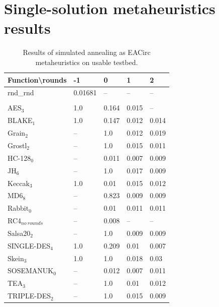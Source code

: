 \documentclass[
  print, %
  Table,   %
  nolof,     %
  nolot,     %
  11pt, %
  oneside  %
]{fithesis3}
\newcommand{\fd}{\cellcolor{red!13}}
\newcommand{\fn}{\cellcolor{green!13}}
\begin{document}
\section{Single-solution metaheuristics results}
\label{sec:app-ss-res}

\begin{table}[H]
\centering
\begin{tabular}{l|l l l l}
Function\textbackslash{}rounds & -1 & 0 & 1 & 2\\ \hline
rnd\_rnd         & \fn{}0.01681 & --       & --         & --        \\\\
AES$_{3}$        & \fd{}1.0   & \fd{}0.164 & \fn{}0.015 & \fn{}--   \\
BLAKE$_{1}$      & \fd{}1.0   & \fd{}0.147 & \fn{}0.012 & \fn{}0.014\\
Grain$_{2}$      & \fd{}--    & \fd{}1.0   & \fn{}0.012 & \fn{}0.019\\
Grostl$_{2}$     & \fd{}--    & \fd{}1.0   & \fn{}0.015 & \fn{}0.011\\
HC-128$_{0}$     & \fd{}--    & \fn{}0.011 & \fn{}0.007 & \fn{}0.009\\
JH$_{6}$         & \fd{}--    & \fd{}1.0   & \fn{}0.017 & \fn{}0.009\\
Keccak$_{3}$     & \fd{}1.0   & \fn{}0.01  & \fn{}0.015 & \fn{}0.012\\
MD6$_{8}$        & \fd{}--    & \fd{}0.823 & \fn{}0.009 & \fn{}0.009\\
Rabbit$_{0}$     & \fd{}--    & \fn{}0.01  & \fn{}0.011 & \fn{}0.011\\
RC4$_{no~rounds}$& --         & \fn{}0.008 & --         & --        \\
Salsa20$_{2}$    & \fd{}--    & \fd{}1.0   & \fn{}0.009 & \fn{}0.009\\
SINGLE-DES$_{4}$ & \fd{}1.0   & \fd{}0.209 & \fn{}0.01  & \fn{}0.007\\
Skein$_{3}$      & \fd{}1.0   & \fd{}1.0   & \fn{}0.018 & \fn{}0.03 \\
SOSEMANUK$_{0}$  & \fd{}--    & \fn{}0.012 & \fn{}0.007 & \fn{}0.011\\
TEA$_{3}$        & \fd{}--    & \fd{}1.0   & \fn{}0.01  & \fn{}0.012\\
TRIPLE-DES$_{2}$ & \fd{}--    & \fd{}1.0   & \fn{}0.015 & \fn{}0.009
\end{tabular}
\caption{Results of simulated annealing as EACirc metaheuristics on usable testbed.}
\label{table:res-usable-sa}
\end{table}
\end{document}
